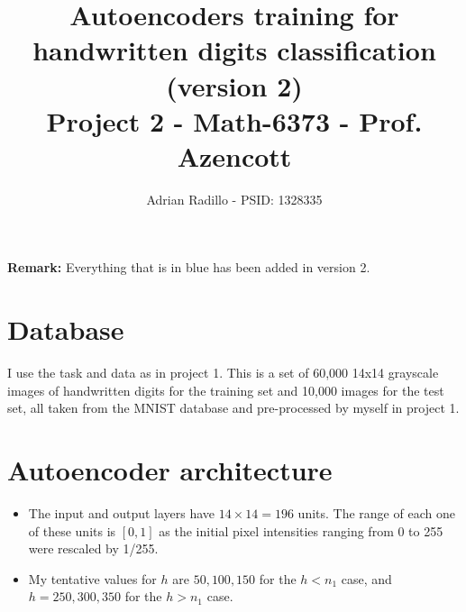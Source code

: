 \documentclass{article}
\title{Autoencoders training for handwritten digits classification {\color{blue}(version 2)} \\ {\large Project 2 - Math-6373 - Prof. Azencott}}
\author{Adrian Radillo - PSID: 1328335}
\begin{document}

\maketitle
{\color{blue}
{\bf Remark:} Everything that is in blue has been added in version 2.
}

\section{Database}
I use the task and data as in project 1. This is a set of
60,000 14x14 grayscale images of handwritten digits for the training set and
10,000 images for the test set, all taken from the MNIST database and pre-processed by myself
in project 1.
\section{Autoencoder architecture}
\begin{itemize}
\item The input and output layers have $14\times14=196$ units. The range of each one of these units  
is $[0,1]$ as the initial pixel intensities ranging from 0 to 255 were rescaled by 1/255.
\item My tentative values for $h$ are $50,100,150$ for the $h<n_1$ case, and $h=250,300,350$ for the $h>n_1$ case.
\end{itemize}
\end{document}
